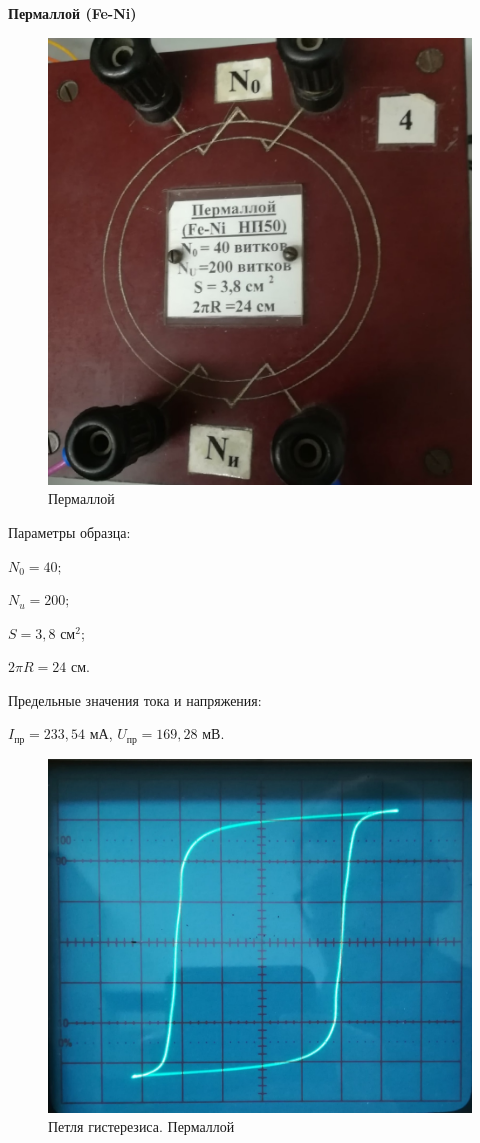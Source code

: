 \documentclass[a4paper,12pt]{article} %
\begin{document}
\newpage
\textbf{{\large Пермаллой (Fe-Ni)}}
\begin{figure}[h!]
	\centering
	\includegraphics[scale=0.6]{Pictures/ПЕРМАЛЛОЙ.jpg}
	\caption{Пермаллой}
\end{figure}

Параметры образца:

$N_0 = 40;$

$N_u = 200;$

$S = 3,8$ см$^2$;

$2\pi R = 24$ см.

\vspace{7mm}
Предельные значения тока и напряжения:

$I_{\text{пр}} = 233,54$ мА, $U_{\text{пр}} = 169,28$ мВ.
\newpage
\begin{figure}[h!]
	\centering
	\includegraphics[scale=0.28]{Pictures/ПЕРМАЛЛОЙ_ПЕТЛЯ.jpg}
	\caption{Петля гистерезиса. Пермаллой}
\end{figure}
\end{document}
